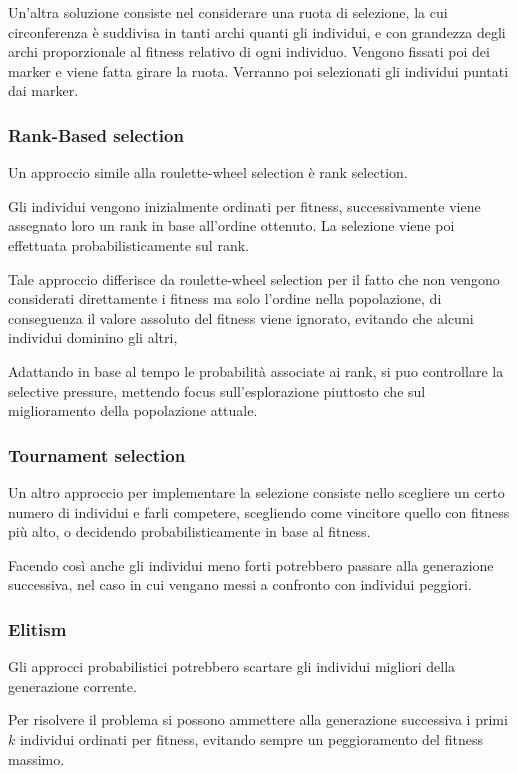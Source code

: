 \documentclass[a4paper]{article}
\begin{document}
Un'altra soluzione consiste nel considerare una ruota di selezione, 
la cui circonferenza è suddivisa in tanti archi quanti gli individui, e con grandezza
degli archi proporzionale al fitness relativo di ogni individuo.
Vengono fissati poi dei marker e viene fatta girare la ruota.
Verranno poi selezionati gli individui puntati dai marker.

\subsubsection{Rank-Based selection}
Un approccio simile alla roulette-wheel selection è rank selection.

Gli individui vengono inizialmente ordinati per fitness, successivamente viene 
assegnato loro un rank in base all'ordine ottenuto.
La selezione viene poi effettuata probabilisticamente sul rank.

Tale approccio differisce da roulette-wheel selection per il fatto che non vengono 
considerati direttamente i fitness ma solo l'ordine nella popolazione, 
di conseguenza il valore assoluto del fitness viene ignorato, evitando che 
alcuni individui dominino gli altri,

Adattando in base al tempo le probabilità associate ai rank, si puo controllare
la selective pressure, mettendo focus sull'esplorazione piuttosto che sul miglioramento
della popolazione attuale.

\subsubsection{Tournament selection}
Un altro approccio per implementare la selezione consiste nello scegliere
un certo numero di individui e farli competere, scegliendo come vincitore
quello con fitness più alto, o decidendo probabilisticamente in base al fitness.

Facendo così anche gli individui meno forti potrebbero passare alla generazione successiva, 
nel caso in cui vengano messi a confronto con individui peggiori.

\subsubsection{Elitism}
Gli approcci probabilistici potrebbero scartare gli individui migliori 
della generazione corrente.

Per risolvere il problema si possono ammettere alla generazione successiva i primi $k$
individui ordinati per fitness, evitando sempre un peggioramento del fitness massimo.
\end{document}
